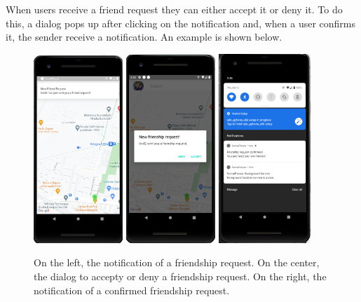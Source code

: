 \documentclass[../../main]{subfiles}
\begin{document}
\noindent
When users receive a friend request they can either accept it or deny it. To do this, a dialog pops up after clicking on the notification and, when a user confirms it, the sender receive a notification.
An example is shown below.
\begin{figure}[H]
    \centering
    \includegraphics[width=0.3\textwidth]{images/app/notification/friend/friend_request_notification.png}
    \includegraphics[width=0.3\textwidth]{images/app/notification/friend/dialog_friend_request.png}
    \includegraphics[width=0.31\textwidth]{images/app/notification/friend/confirmed_request.png}
    \caption{On the left, the notification of a friendship request. On the center, the dialog to accepty or deny a friendship request. On the right, the notification of a confirmed friendship request.}
\end{figure}
\end{document}
